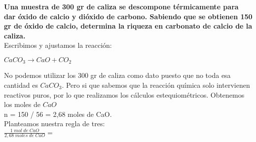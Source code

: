 \begin{exercise}
	\textbf{Una muestra de 300 gr de caliza se descompone térmicamente para dar óxido de calcio y dióxido de carbono. Sabiendo que se obtienen 150 gr de óxido de calcio, determina la riqueza en carbonato de calcio de la caliza.}\\
	
	Escribimos y ajustamos la reacción:\\
	
	\begin{center}
		$CaCO_3 \longrightarrow CaO + CO_2$\\
	\end{center}

No podemos utilizar los 300 gr de caliza como dato puesto que no toda esa cantidad es $CaCO_3$. Pero si que sabemos que la reacción química solo intervienen reactivos puros, por lo que realizamos los cálculos estequiométricos. Obtenemos los moles de $CaO$\\

n = 150 / 56 = 2,68 moles de CaO.\\

Planteamos nuestra regla de tres:\\

$\frac{1 \; mol\; de\; CaO}{2,68 \; moles\; de\; CaO}=$

\end{exercise}
